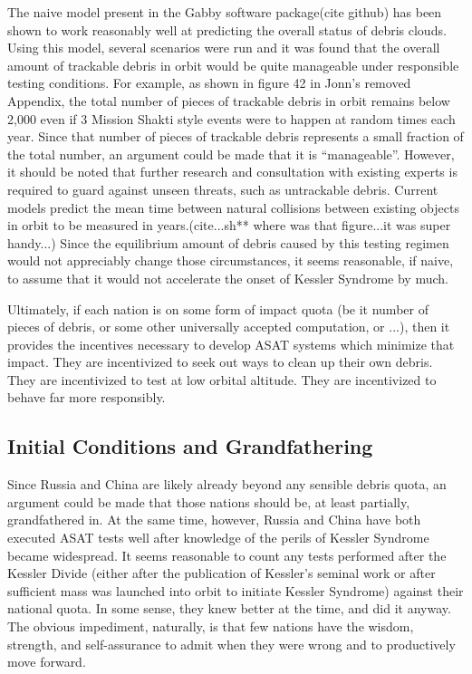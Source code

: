 The naive model present in the Gabby software package(cite github) has
been shown to work reasonably well at predicting the overall status of
debris clouds.  Using this model, several scenarios were run and it
was found that the overall amount of trackable debris in orbit would
be quite manageable under responsible testing conditions.  For
example, as shown in figure 42 in Jonn's removed Appendix, the total
number of pieces of trackable debris in orbit remains below 2,000 even
if 3 Mission Shakti style events were to happen at random times each
year.  Since that number of pieces of trackable debris represents a
small fraction of the total number, an argument could be made that it
is ``manageable''.  However, it should be noted that further research
and consultation with existing experts is required to guard against
unseen threats, such as untrackable debris.  Current models predict
the mean time between natural collisions between existing objects in
orbit to be measured in years.(cite...sh** where was that figure...it
was super handy...)  Since the equilibrium amount of debris caused by
this testing regimen would not appreciably change those circumstances,
it seems reasonable, if naive, to assume that it would not accelerate
the onset of Kessler Syndrome by much.

Ultimately, if each nation is on some form of impact quota (be it
number of pieces of debris, or some other universally accepted
computation, or ...), then it provides the incentives necessary to
develop ASAT systems which minimize that impact.  They are
incentivized to seek out ways to clean up their own debris.  They are
incentivized to test at low orbital altitude.  They are incentivized
to behave far more responsibly.

\subsection{Initial Conditions and Grandfathering}
Since Russia and China are likely already beyond any sensible debris
quota, an argument could be made that those nations should be, at
least partially, grandfathered in.  At the same time, however, Russia
and China have both executed ASAT tests well after knowledge of the
perils of Kessler Syndrome became widespread.  It seems reasonable to
count any tests performed after the Kessler Divide (either after the
publication of Kessler's seminal work or after sufficient mass was
launched into orbit to initiate Kessler Syndrome) against their
national quota.  In some sense, they knew better at the time, and did
it anyway.  The obvious impediment, naturally, is that few nations
have the wisdom, strength, and self-assurance to admit when they were
wrong and to productively move forward.

